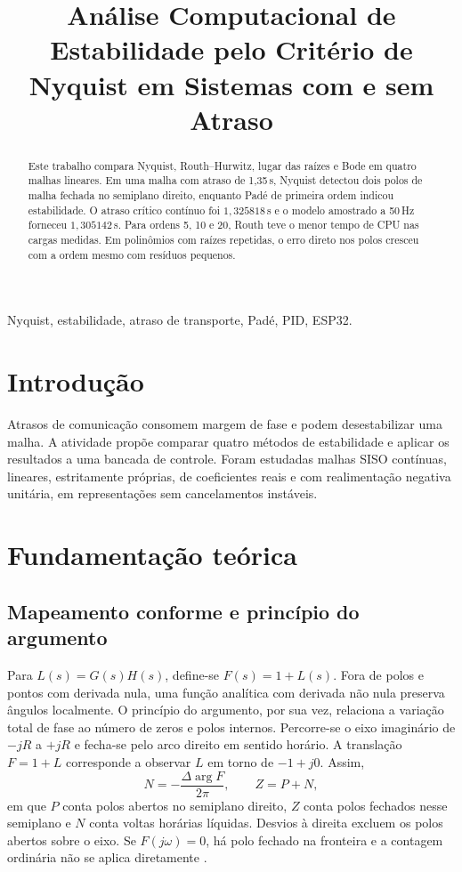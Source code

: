 \documentclass[conference]{IEEEtran}
\title{Análise Computacional de Estabilidade pelo Critério de Nyquist em Sistemas com e sem Atraso}
\author{\IEEEauthorblockN{Thiago Henrique e Mateus Afonso}
\IEEEauthorblockA{Engenharia de Computação\\Pontifícia Universidade Católica de Goiás}}
\begin{document}
\maketitle
\begin{abstract}
Este trabalho compara Nyquist, Routh--Hurwitz, lugar das raízes e Bode em quatro malhas lineares. Em uma malha com atraso de 1,35\,s, Nyquist detectou dois polos de malha fechada no semiplano direito, enquanto Padé de primeira ordem indicou estabilidade. O atraso crítico contínuo foi $1{,}325818$\,s e o modelo amostrado a 50\,Hz forneceu $1{,}305142$\,s. Para ordens 5, 10 e 20, Routh teve o menor tempo de CPU nas cargas medidas. Em polinômios com raízes repetidas, o erro direto nos polos cresceu com a ordem mesmo com resíduos pequenos.
\end{abstract}
\begin{IEEEkeywords}
Nyquist, estabilidade, atraso de transporte, Padé, PID, ESP32.
\end{IEEEkeywords}

\section{Introdução}
Atrasos de comunicação consomem margem de fase e podem desestabilizar uma malha. A atividade \cite{aed} propõe comparar quatro métodos de estabilidade e aplicar os resultados a uma bancada de controle. Foram estudadas malhas SISO contínuas, lineares, estritamente próprias, de coeficientes reais e com realimentação negativa unitária, em representações sem cancelamentos instáveis.

\section{Fundamentação teórica}
\subsection{Mapeamento conforme e princípio do argumento}
Para $L(s)=G(s)H(s)$, define-se $F(s)=1+L(s)$. Fora de polos e pontos com derivada nula, uma função analítica com derivada não nula preserva ângulos localmente. O princípio do argumento, por sua vez, relaciona a variação total de fase ao número de zeros e polos internos. Percorre-se o eixo imaginário de $-jR$ a $+jR$ e fecha-se pelo arco direito em sentido horário. A translação $F=1+L$ corresponde a observar $L$ em torno de $-1+j0$. Assim,
\begin{equation}
 N=-\frac{\Delta\arg F}{2\pi},\qquad Z=P+N ,
\end{equation}
em que $P$ conta polos abertos no semiplano direito, $Z$ conta polos fechados nesse semiplano e $N$ conta voltas horárias líquidas. Desvios à direita excluem os polos abertos sobre o eixo. Se $F(j\omega)=0$, há polo fechado na fronteira e a contagem ordinária não se aplica diretamente \cite{astrom}.
\end{document}
